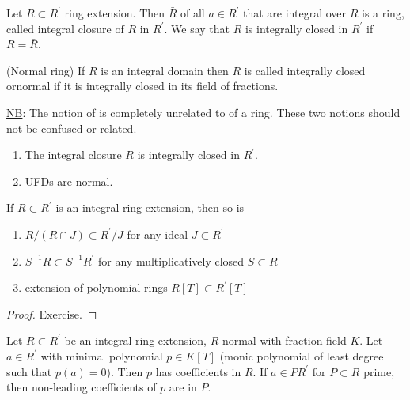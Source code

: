 \documentclass[a4paper,11pt]{article}
\begin{document}
			\begin{defi}
				Let $R\subset R^\prime$ ring extension. Then $\bar{R}$ of all $a\in R^\prime$ that are integral over $R$ is a ring, called integral closure of $R$ in $R^\prime$. We say that $R$ is integrally closed in $R^\prime$ if $R=\bar{R}$.
			\end{defi}

			\begin{defi}(Normal ring)
				If $R$ is an integral domain then $R$ is called integrally closed ornormal if it is integrally closed in its field of fractions.
			\end{defi}

			\noindent\underline{NB}: The notion of  is completely unrelated to  of a ring. These two notions should not be confused or related.

			\begin{eg}
				\begin{enumerate}
					\item The integral closure $\bar{R}$ is integrally closed in $R^\prime$.
					\item UFDs are normal.
				\end{enumerate}
			\end{eg}

			\begin{prop}
				If $R\subset R^\prime$ is an integral ring extension, then so is
				\begin{enumerate}
					\item $R/(R\cap J)\subset R^\prime/J$ for any ideal $J\subset R^\prime$
					\item $S^{-1}R\subset S^{-1}R^\prime$ for any multiplicatively closed $S\subset R$
					\item extension of polynomial rings $R[T]\subset R^\prime[T]$
				\end{enumerate}
			\end{prop}
			\begin{proof}\renewcommand{\qedsymbol}{}
				Exercise.
			\end{proof}\renewcommand{\qedsymbol}{$\square$}

			\begin{prop}
				Let $R\subset R^\prime$ be an integral ring extension, $R$ normal with fraction field $K$. Let $a\in R^\prime$ with minimal polynomial  $p\in K[T]$ (monic polynomial of least degree such that $p(a)=0$). Then $p$ has coefficients in $R$. If $a\in PR^\prime$ for $P\subset R$ prime, then non-leading coefficients of $p$ are in $P$.
			\end{prop}
\end{document}
